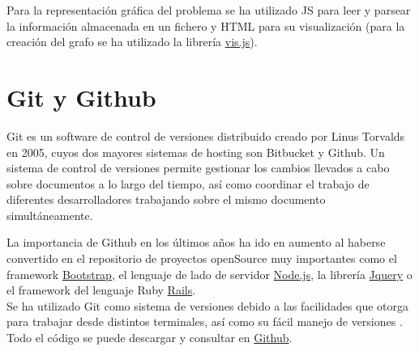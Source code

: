 Para la representación gráfica del problema se ha utilizado JS para leer y parsear la información almacenada en un fichero y HTML para su visualización (para la creación del grafo se ha utilizado la librería \href{http://visjs.org/docs/network/}{vis.js}).

\section{Git y Github}
Git es un software de control de versiones distribuido creado por Linus Torvalds en 2005, cuyos dos mayores sistemas de hosting son Bitbucket y Github. Un sistema de control de versiones permite gestionar los cambios llevados a cabo sobre documentos a lo largo del tiempo, así como coordinar el trabajo de diferentes desarrolladores trabajando sobre el mismo documento simultáneamente.

La importancia de Github en los últimos años ha ido en aumento al haberse convertido en el repositorio de proyectos openSource  muy importantes como el framework \href{https://github.com/twbs/bootstrap}{Bootstrap}, el lenguaje de lado de servidor \href{https://github.com/nodejs/node}{Node.js}, la librería \href{https://github.com/jquery/jquery}{Jquery} o el framework del lenguaje Ruby \href{https://github.com/jquery/jquery}{Rails}.\\

Se ha utilizado Git como sistema de versiones debido a las facilidades que otorga para trabajar desde distintos terminales, así como su fácil manejo de versiones . Todo el código se puede descargar y consultar en  \href{https://github.com/cavasanchez/TFG}{Github}.

